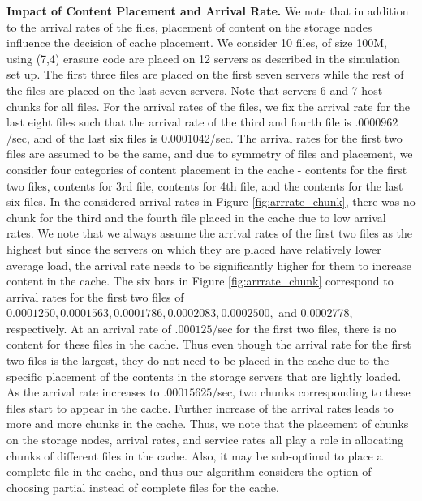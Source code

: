 {\bf Impact of Content Placement and Arrival Rate.} We note that in addition to the arrival rates of the files, placement of content on the storage nodes influence the decision of cache placement. We consider 10 files, of size 100M, using (7,4) erasure code are placed on 12 servers as described in the simulation set up. The first three files are placed on the first seven servers while the rest of the files are placed on the last seven servers. Note that servers 6 and 7 host chunks for all files. For the arrival rates of the files, we fix the arrival rate for the last eight files such that the arrival rate of the third and fourth file is $.0000962$/sec, and of the last six files is 0.0001042/sec. The arrival rates for the first two files are assumed to be the same, and due to symmetry of files and placement, we consider four categories of content placement in the cache - contents for the first two files, contents for 3rd file, contents for 4th file, and the contents for the last six files. In the considered arrival rates in Figure \ref{fig:arrrate_chunk}, there was no chunk for the third and the fourth file placed in the cache due to low arrival rates. We note that we always assume the arrival rates of the first two files as the highest but since the servers on which they are placed have relatively lower average load, the arrival rate needs to be significantly higher for them to increase content in the cache. The six bars in Figure \ref{fig:arrrate_chunk} correspond to arrival rates for the first two files of $0.0001250,    0.0001563,    0.0001786,    0.0002083,    0.0002500,$ and     0.0002778, respectively. At an arrival rate of $.000125$/sec for the first two files, there is no content for these files in the cache. Thus even though the arrival rate for the first two files is the largest, they do not need to be placed in the cache due to the specific placement of the contents in the storage servers that are lightly loaded.  As the arrival rate increases to $.00015625$/sec, two chunks corresponding to these files start to appear in the cache. Further increase of the arrival rates leads to more and more chunks in the cache. Thus, we note that the placement of chunks on the storage nodes, arrival rates, and service rates all play a role in allocating chunks of different files in the cache. Also, it may be sub-optimal to place a complete file in the cache, and thus our algorithm considers the option of choosing partial instead of complete files for the cache.

